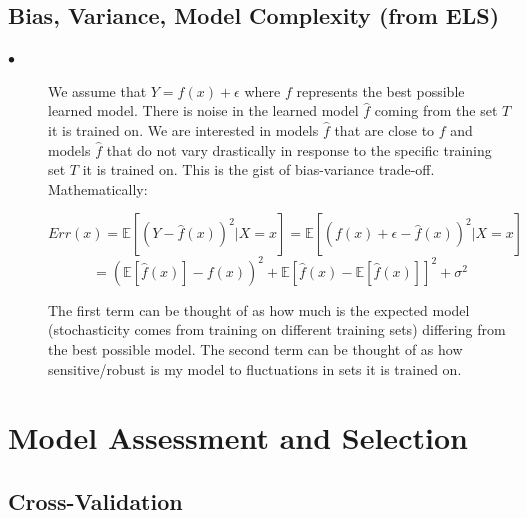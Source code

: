 \documentclass{article}
\begin{document}
\subsection{Bias, Variance, Model Complexity (from ELS)}
\begin{description}

  \item[$\bullet$] We assume that $Y=f(x) + \epsilon$ where $f$ represents the best possible learned model. There is noise in the learned model $\hat{f}$ coming from the set $T$ it is trained on. We are interested in models $\hat{f}$ that are close to $f$ and models $\hat{f}$ that do not vary drastically in response to the specific training set $T$ it is trained on. This is the gist of bias-variance trade-off. Mathematically:
  
  \[Err(x) = \mathbb{E}[(Y-\hat{f}(x))^2|X=x] = \mathbb{E}[(f(x) + \epsilon -\hat{f}(x))^2|X=x]\]
  \[ = (\mathbb{E}[\hat{f}(x)] - f(x))^2 + \mathbb{E}[\hat{f}(x) - \mathbb{E}[\hat{f}(x)]]^2 + \sigma^2\]
  
  The first term can be thought of as how much is the expected model (stochasticity comes from training on different training sets) differing from the best possible model. The second term can be thought of as how sensitive/robust is my model to fluctuations in sets it is trained on.
  

\end{description}

\section{Model Assessment and Selection}

\subsection{Cross-Validation}
\end{document}
